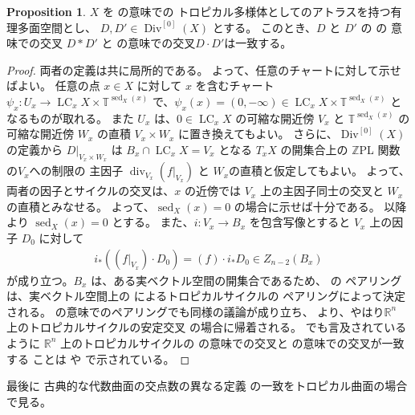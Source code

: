 \documentclass[a4paper,dvipdfmx,reqno,12pt]{amsart}
\theoremstyle{definition}
\newtheorem{proposition}[theorem]{Proposition}
\newcommand{\opn}[1]{\operatorname{#1}}
\numberwithin{equation}{section}
\begin{document}
\begin{proposition}
$X$ を \cite{demedrano2023chern} の意味での
トロピカル多様体としてのアトラスを持つ有理多面空間とし、
$D,D'\in \opn{Div}^{[0]}(X)$ とする。
このとき、$D$ と $D'$ の
\cite[]{demedrano2023chern} の
意味での交叉 $D*D'$ と 
\cite[]{MR4637248}
の意味での交叉$D\cdot D'$は一致する。
\end{proposition}
\begin{proof}
\label{proposition-two-pairings}
両者の定義は共に局所的である。
よって、任意のチャートに対して示せばよい。
任意の点 $x\in X$ に対して $x$ を含むチャート
$ \psi_x
\colon U_x \to 
\opn{LC}_x X\times \mathbb{T}^{\opn{sed}_X(x)}$
で、$\psi_x(x)=(0,-\infty)\in \opn{LC}_x X\times \mathbb{T}^{\opn{sed}_X(x)}$
となるものが取れる。
また $U_x$ は、$0\in \opn{LC}_x X$ の可縮な開近傍
$V_x$ と $\mathbb{T}^{\opn{sed}_X(x)}$ の可縮な開近傍
$W_x$ の直積 $V_x\times W_x$ に置き換えてもよい。
さらに、$\opn{Div}^{[0]}(X)$ の定義から
$D|_{V_x\times W_x}$ は 
$B_x\cap \opn{LC}_x X=V_x$ となる
$T_x X$ の開集合上の
$\mathbb{Z}$PL 関数の$V_x$への制限の
主因子 $\opn{div}_{V_x}(f|_{V_x})$ と
$W_x$の直積と仮定してもよい。
よって、両者の因子とサイクルの交叉は、$x$ の近傍では
$V_x$ 上の主因子同士の交叉と $W_x$ の直積とみなせる。
よって、$\opn{sed}_X(x)=0$ の場合に示せば十分である。
以降より $\opn{sed}_X(x)=0$ とする。
また、$i \colon V_x\to B_x$ を包含写像とすると
$V_x$ 上の因子 $D_0$ に対して
\begin{align}
i_*((f|_{V_x})\cdot D_0)=(f)\cdot i_*D_0
\in Z_{n-2}(B_x)
\end{align}
が成り立つ。$B_x$ は、ある実ベクトル空間の開集合であるため、
\cite[]{MR4637248}の
ペアリングは、実ベクトル空間上の
\cite{MR2591823} によるトロピカルサイクルの
ペアリングによって決定される。
\cite[]{demedrano2023chern}
の意味でのペアリングでも同様の議論が成り立ち、
\cite[Proposition 2.1.9]{shaw2011tropical}
より、やはり$\mathbb{R}^n$
上のトロピカルサイクルの安定交叉
\cite[Definition 4.4]{MR2275625} 
の場合に帰着される。
\cite[]{MR3032930} でも言及されている
ように $\mathbb{R}^n$ 上のトロピカルサイクルの
\cite{MR2591823} の意味での交叉と
\cite{MR2149011,MR2275625} の意味での交叉が一致する
ことは
\cite{MR3529085} や \cite{MR2887109} で示されている。
\end{proof}


最後に
古典的な代数曲面の交点数の異なる定義
の一致をトロピカル曲面の場合で見る。
\end{document}
